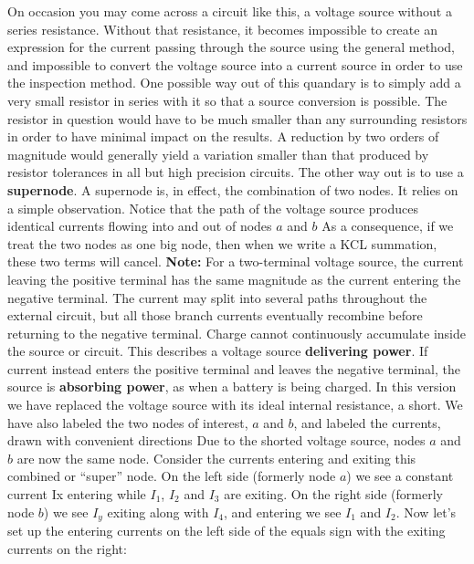 \documentclass{report}
\begin{document}
\begin{itemize}
                \bigbreak \noindent 
                \bigbreak \noindent 
                On occasion you may come across a circuit like this, a voltage source without a series resistance. Without that resistance, it becomes impossible to create an expression for the current passing through the source using the general method, and impossible to convert the voltage source into a current source in order to use the inspection method.
                \bigbreak \noindent 
                One possible way out of this quandary is to simply add a very small resistor in series with it so that a source conversion is possible. The resistor in question would have to be much smaller than any surrounding resistors in order to have minimal impact on the results. A reduction by two orders of magnitude would generally yield a variation smaller than that produced by resistor tolerances in all but high precision circuits. The other way out is to use a \textbf{supernode}.
                \bigbreak \noindent 
                A supernode is, in effect, the combination of two nodes. It relies on a simple observation. Notice that the path of the voltage source produces identical currents flowing into and out of nodes $a$ and $b$
                \bigbreak \noindent 
                As a consequence, if we treat the two nodes as one big node, then when we write a KCL summation, these two terms will cancel.
                \bigbreak \noindent 
                \textbf{Note:} For a two-terminal voltage source, the current leaving the positive terminal has the same magnitude as the current entering the negative terminal. The current may split into several paths throughout the external circuit, but all those branch currents eventually recombine before returning to the negative terminal. Charge cannot continuously accumulate inside the source or circuit.
                \bigbreak \noindent 
                This describes a voltage source \textbf{delivering power}. If current instead enters the positive terminal and leaves the negative terminal, the source is \textbf{absorbing power}, as when a battery is being charged.
                \bigbreak \noindent 
                \bigbreak \noindent 
                In this version we have replaced the voltage source with its ideal internal resistance, a short. We have also labeled the two nodes of interest, $a$ and $b$, and labeled the currents, drawn with convenient directions
                \bigbreak \noindent 
                Due to the shorted voltage source, nodes $a$ and $b$ are now the same node. Consider the currents entering and exiting this combined or “super” node. On the left side (formerly node $a$) we see a constant current Ix entering while $I_{1}$, $I_{2}$ and $I_{3}$ are exiting. On the right side (formerly node $b$) we see $I_{y}$ exiting along with $I_{4}$, and entering we see $I_{1}$ and $I_{2}$. Now let's set up the entering currents on the left side of the equals sign with the exiting currents on the right:

\end{itemize}
\end{document}
